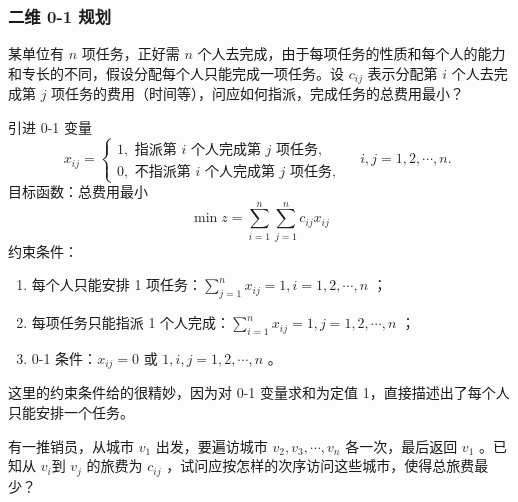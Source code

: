 \subsubsection{二维 0-1 规划}

\begin{example}[指派问题]
    某单位有 $n$ 项任务，正好需 $n$ 个人去完成，由于每项任务的性质和每个人的能力和专长的不同，假设分配每个人只能完成一项任务。设 $c_{i j}$ 表示分配第 $i$ 个人去完成第 $j$ 项任务的费用（时间等），问应如何指派，完成任务的总费用最小？
\end{example}

\begin{solution}
    引进 0-1 变量
    $$
        x_{i j}=\left\{\begin{array}{l}
            1, \text { 指派第 } i \text { 个人完成第 } j \text { 项任务, } \\
            0, \text { 不指派第 } i \text { 个人完成第 } j \text { 项任务, }
        \end{array} \quad i, j=1,2, \cdots, n\right. \text {. }
    $$
    目标函数：总费用最小
    $$
        \min z=\sum_{i=1}^n \sum_{j=1}^n c_{i j} x_{i j}
    $$
    约束条件：
    \begin{enumerate}
        \item 每个人只能安排 1 项任务：$\sum_{j=1}^n x_{i j}=1, i=1,2, \cdots, n$ ；
        \item 每项任务只能指派 1 个人完成：$\sum_{i=1}^n x_{i j}=1, j=1,2, \cdots, n$ ；
        \item 0-1 条件：$x_{i j}=0$ 或 $1, i, j=1,2, \cdots, n$ 。
    \end{enumerate}
\end{solution}

\begin{tips}
    这里的约束条件给的很精妙，因为对 0-1 变量求和为定值 1，直接描述出了每个人只能安排一个任务。
\end{tips}

\begin{example}[旅行商问题]
    有一推销员，从城市 $v_1$ 出发，要遍访城市 $v_2, v_3, \cdots, v_n$ 各一次，最后返回 $v_1$ 。已知从 $v_i$到 $v_j$ 的旅费为 $c_{i j}$ ，试问应按怎样的次序访问这些城市，使得总旅费最少？
\end{example}

